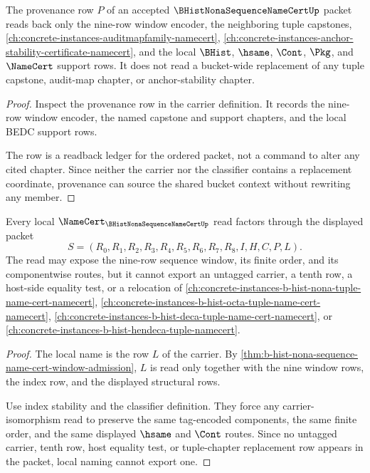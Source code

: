 \begin{theorem}
\label{thm:b-hist-nona-sequence-name-cert-provenance-readback}
The provenance row $P$ of an accepted $\BHistNonaSequenceNameCertUp$ packet reads back only the nine-row window encoder, the neighboring tuple capstones, \autoref{ch:concrete-instances-auditmapfamily-namecert}, \autoref{ch:concrete-instances-anchor-stability-certificate-namecert}, and the local $\BHist$, $\hsame$, $\Cont$, $\Pkg$, and $\NameCert$ support rows. It does not read a bucket-wide replacement of any tuple capstone, audit-map chapter, or anchor-stability chapter.
\end{theorem}
\begin{proof}
Inspect the provenance row in the carrier definition. It records the nine-row window encoder, the named capstone and support chapters, and the local BEDC support rows.

The row is a readback ledger for the ordered packet, not a command to alter any cited chapter. Since neither the carrier nor the classifier contains a replacement coordinate, provenance can source the shared bucket context without rewriting any member.
\end{proof}

\begin{theorem}
\label{thm:b-hist-nona-sequence-name-cert-local-naming-nonescape}
Every local $\NameCert_{\BHistNonaSequenceNameCertUp}$ read factors through the displayed packet
$$
S=(R_0,R_1,R_2,R_3,R_4,R_5,R_6,R_7,R_8,I,H,C,P,L).
$$
The read may expose the nine-row sequence window, its finite order, and its componentwise routes, but it cannot export an untagged carrier, a tenth row, a host-side equality test, or a relocation of \autoref{ch:concrete-instances-b-hist-nona-tuple-name-cert-namecert}, \autoref{ch:concrete-instances-b-hist-octa-tuple-name-cert-namecert}, \autoref{ch:concrete-instances-b-hist-deca-tuple-name-cert-namecert}, or \autoref{ch:concrete-instances-b-hist-hendeca-tuple-namecert}.
\end{theorem}
\begin{proof}
The local name is the row $L$ of the carrier. By \autoref{thm:b-hist-nona-sequence-name-cert-window-admission}, $L$ is read only together with the nine window rows, the index row, and the displayed structural rows.

Use index stability and the classifier definition. They force any carrier-isomorphism read to preserve the same tag-encoded components, the same finite order, and the same displayed $\hsame$ and $\Cont$ routes. Since no untagged carrier, tenth row, host equality test, or tuple-chapter replacement row appears in the packet, local naming cannot export one.
\end{proof}

